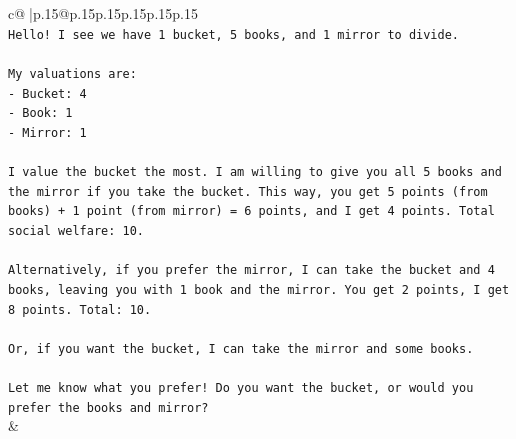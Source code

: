 \documentclass{article}
\begin{document}
{\begin{supertabular}{c@{$\;$}|p{.15\linewidth}@{}p{.15\linewidth}p{.15\linewidth}p{.15\linewidth}p{.15\linewidth}p{.15\linewidth}}
{{{\\ 
\texttt{Hello! I see we have 1 bucket, 5 books, and 1 mirror to divide.} \\
\\ 
\texttt{My valuations are:} \\
\texttt{{-} Bucket: 4} \\
\texttt{{-} Book: 1} \\
\texttt{{-} Mirror: 1} \\
\\ 
\texttt{I value the bucket the most. I am willing to give you all 5 books and the mirror if you take the bucket. This way, you get 5 points (from books) + 1 point (from mirror) = 6 points, and I get 4 points. Total social welfare: 10.} \\
\\ 
\texttt{Alternatively, if you prefer the mirror, I can take the bucket and 4 books, leaving you with 1 book and the mirror. You get 2 points, I get 8 points. Total: 10.} \\
\\ 
\texttt{Or, if you want the bucket, I can take the mirror and some books.} \\
\\ 
\texttt{Let me know what you prefer! Do you want the bucket, or would you prefer the books and mirror?} \\
            }
        }
    }
    & \\ \\


\end{supertabular}}
\end{document}

